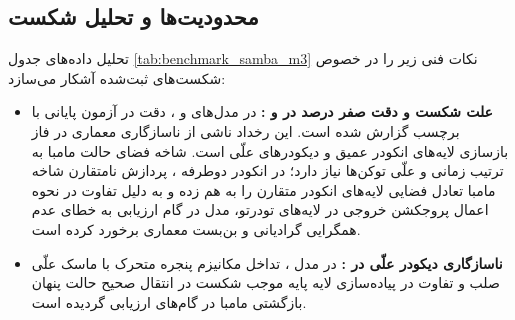 \subsection{محدودیت‌ها و تحلیل شکست}
تحلیل داده‌های جدول \ref{tab:benchmark_samba_m3} نکات فنی زیر را در خصوص شکست‌های ثبت‌شده آشکار می‌سازد:
\begin{itemize}
    \item \textbf{علت شکست و دقت صفر درصد در  و :} در مدل‌های  و ، دقت در آزمون پایانی  با برچسب  گزارش شده است. این رخداد ناشی از ناسازگاری معماری در فاز بازسازی لایه‌های انکودر عمیق و دیکودرهای علّی است. شاخه فضای حالت مامبا به ترتیب زمانی و علّی توکن‌ها نیاز دارد؛ در انکودر دوطرفه ، پردازش نامتقارن شاخه مامبا تعادل فضایی لایه‌های انکودر متقارن را به هم زده و به دلیل تفاوت در نحوه اعمال پروجکشن خروجی در لایه‌های تودرتو، مدل در گام ارزیابی به خطای عدم همگرایی گرادیانی و بن‌بست معماری برخورد کرده است.
    \item \textbf{ناسازگاری دیکودر علّی در :} در مدل ، تداخل مکانیزم پنجره متحرک با ماسک علّی صلب و تفاوت در پیاده‌سازی  لایه پایه موجب شکست در انتقال صحیح حالت پنهان بازگشتی مامبا در گام‌های ارزیابی گردیده است.
\end{itemize}
